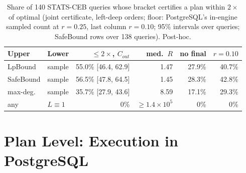 \documentclass[sigconf, nonacm]{acmart}
\begin{document}
\begin{table}[t]
\centering
\caption{Share of 140 STATS-CEB queries whose bracket certifies a plan within
$2\times$ of optimal (joint certificate, left-deep orders; floor: PostgreSQL's
in-engine sampled count at $r{=}0.25$, last column $r{=}0.10$; 95\% intervals
over queries; SafeBound rows over 138 queries). Post-hoc.}
\label{tab:certificates}
\footnotesize
\setlength{\tabcolsep}{3pt}
\begin{tabular}{@{}llrrrr@{}}
\toprule
Upper & Lower & $\le2\times$, $C_{out}$ & med.\ $R$ & no final & $r{=}0.10$ \\ \midrule
LpBound & sample & 55.0\% [46.4, 62.9] & 1.47 & 27.9\% & 40.7\% \\
SafeBound & sample & 56.5\% [47.8, 64.5] & 1.45 & 28.3\% & 42.8\% \\
max-deg. & sample & 35.7\% [27.9, 43.6] & 8.59 & 17.1\% & 29.3\% \\
any & $L\equiv1$ & 0\% & ${\ge}1.4{\times}10^{5}$ & 0\% & 0\% \\
\bottomrule
\end{tabular}
\end{table}
\section{Plan Level: Execution in PostgreSQL}
\label{sec:execution}
\end{document}
